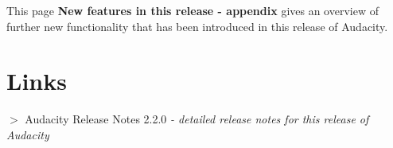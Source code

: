 This page \textbf{New features in this release - appendix} gives an overview of further new functionality that has been introduced in this release of Audacity.



\section{Links}


\textbf{\mbox{$>$}} Audacity Release Notes 2.2.0 \textit{- detailed release notes for this release of Audacity}%
% 
%  
% 
%  

											
